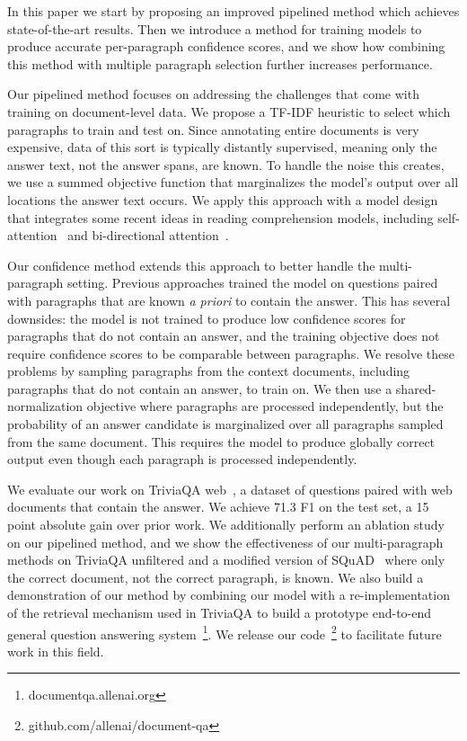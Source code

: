 \documentclass[11pt,a4paper]{article}
\begin{document}
In this paper we start by proposing an improved pipelined method which achieves state-of-the-art results. Then we introduce a method for training models to produce accurate per-paragraph confidence scores, and we show how combining this method with multiple paragraph selection further increases performance.

Our pipelined method focuses on addressing the challenges that come with training on document-level data. We propose a TF-IDF heuristic to select which paragraphs to train and test on. Since annotating entire documents is very expensive, data of this sort is typically distantly supervised, meaning only the answer text, not the answer spans, are known. To handle the noise this creates, we use a summed objective function that marginalizes the model's output over all locations the answer text occurs. 
We apply this approach with a model design that integrates some recent ideas in reading comprehension models, including self-attention~\cite{cheng2016long} and bi-directional attention~\cite{bidaf}.

Our confidence method extends this approach to better handle the multi-paragraph setting. Previous approaches trained the model on questions paired with paragraphs that are known \textit{a priori} to contain the answer. This has several downsides: the model is not trained to produce low confidence scores for paragraphs that do not contain an answer, and the training objective does not require confidence scores to be comparable between paragraphs. We resolve these problems by sampling paragraphs from the context documents, including paragraphs that do not contain an answer, to train on. We then use a shared-normalization objective where paragraphs are processed independently, but the probability of an answer candidate is marginalized over all paragraphs sampled from the same document. This requires the model to produce globally correct output even though each paragraph is processed independently.

We evaluate our work on TriviaQA web~\cite{triviaqa}, a dataset of questions paired with web documents that contain the answer. We achieve 71.3 F1 on the test set, a 15 point absolute gain over prior work. We additionally perform an ablation study on our pipelined method, and we show the effectiveness of our multi-paragraph methods on TriviaQA unfiltered and a modified version of SQuAD~\cite{squad} where only the correct document, not the correct paragraph, is known. We also build a demonstration of our method by combining our model with a re-implementation of the retrieval mechanism used in TriviaQA to build a prototype end-to-end general question answering system~\footnote{documentqa.allenai.org}. We release our code~\footnote{github.com/allenai/document-qa} to facilitate future work in this field.
\end{document}
